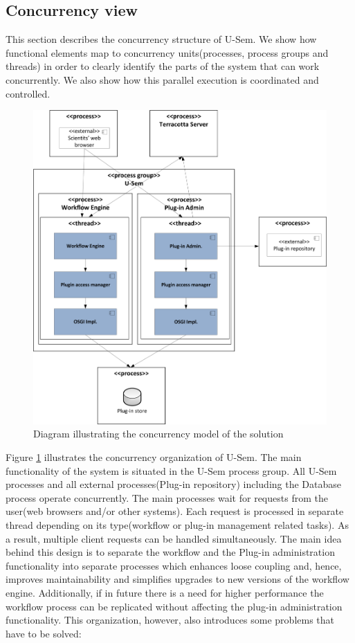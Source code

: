 \subsection{Concurrency view}

This section describes the concurrency structure of U-Sem. We show how functional elements map to concurrency units(processes, process groups and threads) in order to clearly identify the parts of the system that can work concurrently. We also show how this parallel execution is coordinated and controlled.

\begin{figure}[h!]
  \centering
  	\includegraphics[scale=0.70]{plug-in/layers/concur.png}
  \caption{Diagram illustrating the concurrency model of the solution}
  \label{fig_conc}
\end{figure}

Figure \ref{fig_conc} illustrates the concurrency organization of U-Sem. The main functionality of the system is situated in the U-Sem process group. All U-Sem processes and all external processes(Plug-in repository) including the Database process operate concurrently. The main processes wait for requests from the user(web browsers and/or other systems). Each request is processed in separate thread depending on its type(workflow or plug-in management related tasks). As a result, multiple client requests can be handled simultaneously. The main idea behind this design is to separate the workflow and the Plug-in administration functionality into separate processes which enhances loose coupling and, hence, improves maintainability and simplifies upgrades to new versions of the workflow engine. Additionally, if in future there is a need for higher performance the workflow process can be replicated without affecting the plug-in administration functionality. This organization, however, also introduces some problems that have to be solved:


